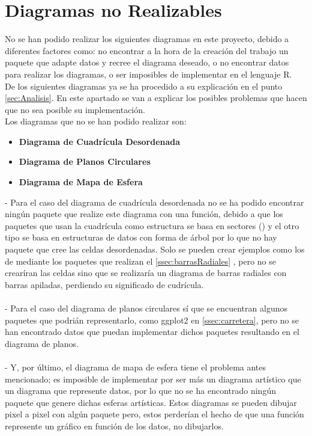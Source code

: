 \documentclass{article}\usepackage[]{graphicx}\usepackage[]{color}
\begin{document}
\section{Diagramas no Realizables}
No se han podido realizar los siguientes diagramas en este proyecto, debido a diferentes factores como: no encontrar a la hora de la creaci\'on del trabajo un paquete que adapte datos y recree el diagrama deseado, o no encontrar datos para realizar los diagramas, o ser imposibles de implementar en el lenguaje R.~\\
De los siguientes diagramas ya se ha procedido a su explicaci\'on en el punto  \ref{sec:Analisis}. En este apartado se van a explicar los posibles problemas que hacen que no sea posible su implementaci\'on.~\\
Los diagramas que no se han podido realizar son:
\begin{itemize}
\item \textbf{Diagrama de Cuadr\'icula Desordenada}
\item \textbf{Diagrama de Planos Circulares}
\item \textbf{Diagrama de Mapa de Esfera}
\end{itemize}
 - Para el caso del diagrama de cuadr\'icula desordenada no se ha podido encontrar ning\'un paquete que realize este diagrama con una funci\'on, debido a que los paquetes que usan la cuadr\'icula como estructura se basa en sectores ()
 y el otro tipo se basa en estructuras de datos con forma de \'arbol por lo que no hay paquete que cree las celdas desordenadas. Solo se pueden crear ejemplos como los de \cite[p\'ag 136]{Circle}
 mediante los paquetes que realizan el  \ref{ssec:barrasRadiales}
 , pero no se crear\'iran las celdas sino que se realizar\'ia un diagrama de barras radiales con barras apiladas, perdiendo su significado de cudr\'icula.~\\~\\
 - Para el caso del diagrama de planos circulares s\'i que se encuentran algunos paquetes que podri\'an representarlo, como ggplot2 en  \ref{ssec:carretera}, pero no se han encontrado datos que puedan implementar dichos paquetes resultando en el diagrama de planos.~\\~\\
 - Y, por \'ultimo, el diagrama de mapa de esfera tiene el problema antes mencionado; es imposible de implementar por ser m\'as un diagrama art\'istico que un diagrama que represente datos, por lo que no se ha encontrado ning\'un paquete que genere dichas esferas art\'isticas. Estos diagramas se pueden dibujar pixel a pixel con alg\'un paquete pero, estos perder\'ian el hecho de que una funci\'on represente un gr\'afico en funci\'on de los datos, no dibujarlos.~\\~\\~\\
\end{document}
